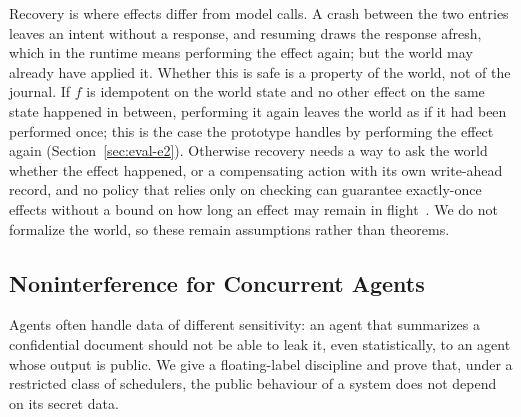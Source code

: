 Recovery is where effects differ from model calls.
A crash between the two entries leaves an intent without a response, and resuming draws the
response afresh, which in the runtime means performing the effect again; but the world may
already have applied it.
Whether this is safe is a property of the world, not of the journal.
If $f$ is idempotent on the world state and no other effect on the same state happened in
between, performing it again leaves the world as if it had been performed once; this is the
case the prototype handles by performing the effect again (Section~\ref{sec:eval-e2}).
Otherwise recovery needs a way to ask the world whether the effect happened, or a compensating
action with its own write-ahead record, and no policy that relies only on checking can
guarantee exactly-once effects without a bound on how long an effect may remain in
flight~\citep{li2026exactlyonce}.
We do not formalize the world, so these remain assumptions rather than theorems.

\subsection{Noninterference for Concurrent Agents}
\label{sec:ni}

Agents often handle data of different sensitivity: an agent that summarizes a confidential
document should not be able to leak it, even statistically, to an agent whose output is public.
We give a floating-label discipline and prove that, under a restricted class of schedulers, the
public behaviour of a system does not depend on its secret data.

